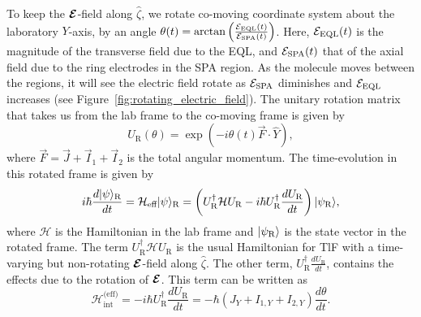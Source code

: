 To keep the $\bm{\mathcal{E}}$-field along $\hat{\zeta}$, we rotate co-moving coordinate system about the laboratory $Y$-axis, by an angle $ \theta(t) = \arctan\left(\frac{\mathcal{E}_{\rm EQL}(t)}{\mathcal{E}_{\rm SPA}(t)}\right)$. Here, $ \mathcal{E}_{\rm EQL}(t) $ is the magnitude of the transverse field due to the EQL, and $ \mathcal{E}_{\rm SPA}(t) $ that of the axial field due to the ring electrodes in the SPA region. As the molecule moves between the regions, it will see the electric field rotate as $\mathcal{E}_{\rm SPA}$ diminishes and $\mathcal{E}_{\rm EQL}$ increases (see Figure~\ref{fig:rotating_electric_field}). The unitary rotation matrix that takes us from the lab frame to the co-moving frame is given by 
\begin{equation}
	U_\text{R}(\theta) = \exp(-i\theta (t) \vec{F}\cdot\hat{Y}),
\end{equation}
where $\vec{F} = \vec{J} + \vec{I}_1 + \vec{I}_2$ is the total angular momentum. The time-evolution in this rotated frame is given by
\begin{equation}
ih\hspace*{-0.3em}\bar{}\hspace*{0.25em}\frac{d|\psi\rangle_\text{R}}{dt} = \mathcal{H}_\text{eff}|\psi\rangle_\text{R} = 
\left(U_\text{R}^\dagger \mathcal{H} U_\text{R} - ih\hspace*{-0.3em}\bar{}\hspace*{0.25em} U_\text{R}^\dagger\frac{dU_\text{R}}{dt}\right)|\psi_\text{R}\rangle,
\end{equation}
where $\mathcal{H}$ is the Hamiltonian in the lab frame and $|\psi_\text{R}\rangle$ is the state vector in the rotated frame. The term $U_\text{R}^\dagger \mathcal{H} U_\text{R}$ is the usual Hamiltonian for TlF with a time-varying but non-rotating $\bm{\mathcal{E}}$-field along $\hat{\zeta}$. The other term, $U_\text{R}^\dagger\frac{dU_\text{R}}{dt}$, contains the effects due to the rotation of $\bm{\mathcal{E}}$. This term can be written as
\begin{equation}
\mathcal{H}_\text{int}^\text{(eff)} = - i\hbar U_\text{R}^\dagger\frac{dU_\text{R}}{dt} =  -\hbar\left(J_Y+I_{1,Y}+I_{2,Y}\right)\frac{d\theta}{dt}.
\end{equation}

